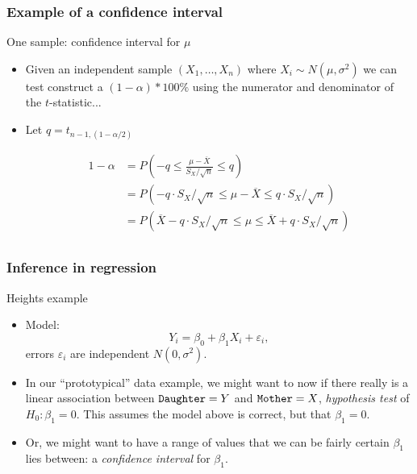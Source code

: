 \documentclass[handout]{beamer}
\begin{document}
   \begin{frame} \frametitle{Example of a confidence interval}

   \begin{block}
   {One sample: confidence interval for $\mu$}
   \begin{itemize}[<+->]

   \item Given an independent sample $(X_1, \dots, X_n)$ where
   $X_i\sim N(\mu,\sigma^2)$ we can test construct
   a $(1-\alpha)*100\%$ using the
   numerator and denominator of the $t$-statistic...

   \item Let $q=t_{n-1,(1-\alpha/2)}$

   $$
   \begin{aligned}
   1 - \alpha &= P\left(-q \leq \frac{\mu - \overline{X}}
   {S_X / \sqrt{n}} \leq q \right) \\
   &= P\left(-q \cdot {S_X / \sqrt{n}} \leq {\mu - \overline{X}}
   \leq q  \cdot {S_X / \sqrt{n}} \right) \\
   &= P\left(\overline{X} - q  \cdot {S_X / \sqrt{n}}
   \leq {\mu} \leq \overline{X} + q  \cdot {S_X / \sqrt{n}} \right) \\
   \end{aligned}
   $$

   \end{itemize}
   \end{block}
   \end{frame}


   \begin{frame} \frametitle{Inference in regression}

   \begin{block}
   {Heights example}
   \begin{itemize}

   \item Model:
   $$
   Y_i = \beta_0 + \beta_1 X_i + \varepsilon_i,$$
   errors $\varepsilon_i$ are independent $N(0, \sigma^2)$.
   \item In our ``prototypical'' data example, we might want to now if there
   really is a linear association between ${\tt Daughter}=Y$
   and ${\tt Mother}=X$, {\em hypothesis test} of $H_0:\beta_1=0$.
   This assumes the model above is correct, but that $\beta_1=0$.

   \item Or, we might want to have a range of values that we can be fairly certain $\beta_1$ lies between: a {\em confidence interval} for $\beta_1$.
   \end{itemize}
   \end{block}
   \end{frame}
\end{document}
